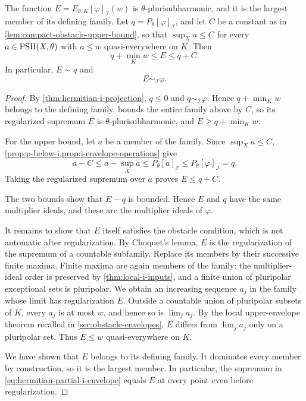 \begin{theorem}\label{thm:hermitian-partial-i-envelope}
The function $E=E_{\theta,K}[\varphi]_{\mathcal I}(w)$ is $\theta$-plurisubharmonic, and it is the largest member of its defining family. Let $q=P_\theta[\varphi]_{\mathcal I}$, and let $C$ be a constant as in \cref{lem:compact-obstacle-upper-bound}, so that $\sup_Xa\leq C$ for every $a\in\mathrm{PSH}(X,\theta)$ with $a\leq w$ quasi-everywhere on $K$. Then
\[
 q+\min_Kw\leq E\leq q+C.
\]
In particular, $E\sim q$ and
\[
 E\sim_{\mathcal I}\varphi.
\]
\end{theorem}
\begin{proof}
By \cref{thm:hermitian-i-projection}, $q\leq0$ and $q\sim_{\mathcal I}\varphi$. Hence $q+\min_Kw$ belongs to the defining family.  bounds the entire family above by $C$, so its regularized supremum $E$ is $\theta$-plurisubharmonic, and $E\geq q+\min_Kw$.

For the upper bound, let $a$ be a member of the family. Since $\sup_Xa\leq C$, \cref{prop:p-below-i,prop:i-envelope-operations} give
\[
 a-C\leq a-\sup_Xa\leq P_\theta[a]_{\mathcal I}
                    \leq P_\theta[\varphi]_{\mathcal I}=q.
\]
Taking the regularized supremum over $a$ proves $E\leq q+C$.

The two bounds show that $E-q$ is bounded. Hence $E$ and $q$ have the same multiplier ideals, and these are the multiplier ideals of $\varphi$.

It remains to show that $E$ itself satisfies the obstacle condition, which is not automatic after regularization. By Choquet's lemma, $E$ is the regularization of the supremum of a countable subfamily. Replace its members by their successive finite maxima. Finite maxima are again members of the family: the multiplier-ideal order is preserved by \cref{thm:local-i-inputs}, and a finite union of pluripolar exceptional sets is pluripolar. We obtain an increasing sequence $a_j$ in the family whose limit has regularization $E$. Outside a countable union of pluripolar subsets of $K$, every $a_j$ is at most $w$, and hence so is $\lim_ja_j$. By the local upper-envelope theorem recalled in \cref{sec:obstacle-envelopes}, $E$ differs from $\lim_ja_j$ only on a pluripolar set. Thus $E\leq w$ quasi-everywhere on $K$.

We have shown that $E$ belongs to its defining family. It dominates every member by construction, so it is the largest member. In particular, the supremum in \eqref{eq:hermitian-partial-i-envelope} equals $E$ at every point even before regularization.
\end{proof}

